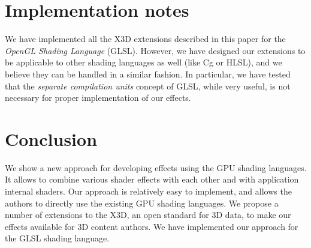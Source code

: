 \documentclass{egpubl}
\begin{document}

\section{Implementation notes}

We have implemented all the X3D extensions described in this paper
for the \emph{OpenGL Shading Language} (GLSL).
However, we have designed our extensions
to be applicable to other shading languages as well (like Cg or HLSL),
and we believe they can be handled in a similar fashion.
In particular, we have tested that the \emph{separate compilation units}
concept of GLSL, while very useful, is not necessary for proper implementation
of our effects.



\section{Conclusion}

We show a new approach for developing effects using the GPU shading languages.
It allows to combine various shader effects with each other
and with application internal shaders.
Our approach is relatively easy
to implement, and allows the authors to directly use the existing GPU shading
languages.
We propose a number of extensions to the X3D,
an open standard for 3D data, to make our effects available for 3D
content authors. We have implemented our approach for the GLSL shading language.





\end{document}
